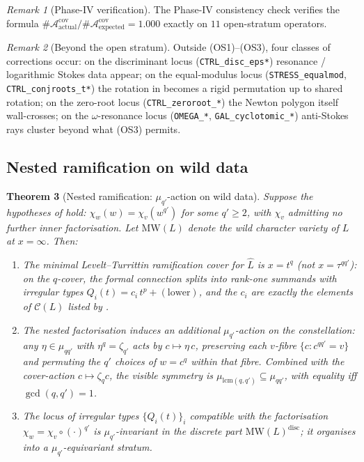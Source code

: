 \documentclass[11pt,a4paper]{article}
\theoremstyle{plain}
\newtheorem{theorem}{Theorem}[section]
\theoremstyle{definition}
\theoremstyle{remark}
\newtheorem{remark}[theorem]{Remark}
\newcommand{\Cl}{\mathcal{C}}
\newcommand{\MW}{\mathrm{MW}}
\newcommand{\Acov}{\mathcal{A}^{\mathrm{cov}}}
\begin{document}
\begin{remark}[Phase-IV verification]\label{rem:AT1-verif}
The Phase-IV consistency check
\cite[phase4\_stokes.json]{wkb_dataset_v1} verifies the formula
$\#\Acov_{\mathrm{actual}} / \#\Acov_{\mathrm{expected}} = 1.000$ exactly
on $11$ open-stratum operators.
\end{remark}

\begin{remark}[Beyond the open stratum]\label{rem:AT1-degenerate}
Outside (OS1)--(OS3), four classes of corrections occur:
on the discriminant locus (\texttt{CTRL\_disc\_eps*}) resonance /
logarithmic Stokes data appear; on the equal-modulus locus
(\texttt{STRESS\_equalmod}, \texttt{CTRL\_conjroots\_t*}) the rotation
in  becomes a rigid permutation up to shared rotation;
on the zero-root locus (\texttt{CTRL\_zeroroot\_*}) the Newton polygon
itself wall-crosses; on the $\omega$-resonance locus
(\texttt{OMEGA\_*}, \texttt{GAL\_cyclotomic\_*}) anti-Stokes rays cluster
beyond what (OS3) permits.
\end{remark}

\subsection{Nested ramification on wild data}\label{ssec:AT3}

\begin{theorem}[Nested ramification: $\mu_{q'}$-action on wild data]\label{thm:AT3}
Suppose the hypotheses of  hold: $\chi_w(w) = \chi_v(w^{q'})$
for some $q' \ge 2$, with $\chi_v$ admitting no further inner factorisation.
Let $\MW(L)$ denote the wild character variety of $L$ at $x = \infty$.
Then:
\begin{enumerate}[leftmargin=2em]
\item The minimal Levelt--Turrittin ramification cover for $\widehat{L}$
      is $x = t^q$ (not $x = \tau^{qq'}$): on the $q$-cover, the formal
      connection splits into rank-one summands with irregular types
      $Q_i(t) = c_i\, t^p + (\text{lower})$, and the $c_i$ are exactly
      the elements of $\Cl(L)$ listed by .
\item The nested factorisation induces an \emph{additional}
      $\mu_{q'}$-action on the constellation: any $\eta \in \mu_{qq'}$
      with $\eta^q = \zeta_{q'}$ acts by $c \mapsto \eta\, c$, preserving
      each $v$-fibre $\{c : c^{qq'} = v\}$ and permuting the $q'$ choices
      of $w = c^q$ within that fibre. Combined with the cover-action
      $c \mapsto \zeta_q c$, the visible symmetry is $\mu_{\mathrm{lcm}(q,
      q')} \subseteq \mu_{qq'}$, with equality iff $\gcd(q, q') = 1$.
\item The locus of irregular types $\{Q_i(t)\}_i$ compatible with the
      factorisation $\chi_w = \chi_v \circ (\cdot)^{q'}$ is
      $\mu_{q'}$-invariant in the discrete part $\MW(L)^{\mathrm{disc}}$;
      it organises into a $\mu_{q'}$-equivariant stratum.
\end{enumerate}
\end{theorem}
\end{document}
